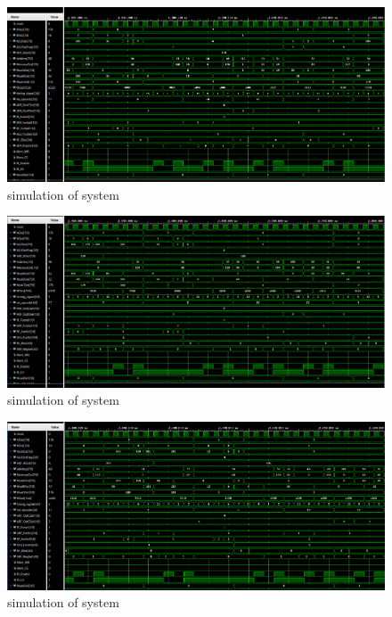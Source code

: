 \documentclass[pdftex,12pt,a4paper]{article}
\begin{document}
\begin{figure}[H]
    \centering
    \includegraphics[width=1\textwidth]{photos/system_result_5.png}	
    \caption{simulation of system}
    \label{implementation}
\end{figure}


\begin{figure}[H]
    \centering
    \includegraphics[width=1\textwidth]{photos/system_result_6.png}	
    \caption{simulation of system}
    \label{implementation}
\end{figure}


\begin{figure}[H]
    \centering
    \includegraphics[width=1\textwidth]{photos/system_result_7.png}	
    \caption{simulation of system}
    \label{implementation}
\end{figure}
\end{document}
